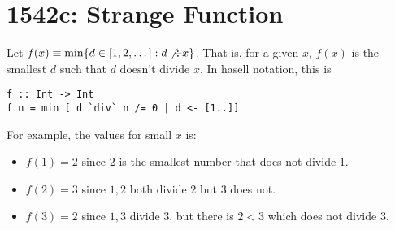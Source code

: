 \section{1542c: Strange Function}

Let $f(x) \equiv \min \{ d \in [1, 2, \dots]  : d \not \div x \}$. That is, for a given $x$, $f(x)$ is the smallest $d$ such that $d$ doesn't divide $x$.
In hasell notation, this is

\begin{verbatim}
f :: Int -> Int
f n = min [ d `div` n /= 0 | d <- [1..]]
\end{verbatim}

For example, the values for small $x$ is:
\begin{itemize}
\item $f(1) = 2$ since $2$ is the smallest number that does not divide $1$.
\item $f(2) = 3$ since $1, 2$ both divide $2$ but $3$ does not.
\item $f(3) = 2$ since $1, 3$ divide $3$, but there is $2 < 3$ which does not divide $3$.
\end{itemize}

